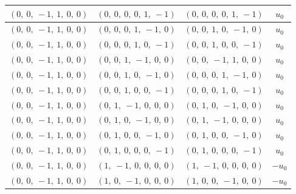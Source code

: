 \documentclass[11pt]{article}
\theoremstyle{definition}
\begin{document}
\begin{longtable}{|l|l|l|c|}
    \hline
    $\left( 0, \  0, \  -1, \  1, \  0, \  0\right)$ & $\left( 0, \  0, \  0, \  0, \  1, \  -1\right)$ & $\left( 0, \  0, \  0, \  0, \  1, \  -1\right)$ & $u_{0}$ \\
    \hline
    $\left( 0, \  0, \  -1, \  1, \  0, \  0\right)$ & $\left( 0, \  0, \  0, \  1, \  -1, \  0\right)$ & $\left( 0, \  0, \  1, \  0, \  -1, \  0\right)$ & $u_{0}$ \\
    \hline
    $\left( 0, \  0, \  -1, \  1, \  0, \  0\right)$ & $\left( 0, \  0, \  0, \  1, \  0, \  -1\right)$ & $\left( 0, \  0, \  1, \  0, \  0, \  -1\right)$ & $u_{0}$ \\
    \hline
    $\left( 0, \  0, \  -1, \  1, \  0, \  0\right)$ & $\left( 0, \  0, \  1, \  -1, \  0, \  0\right)$ & $\left( 0, \  0, \  -1, \  1, \  0, \  0\right)$ & $u_{0}$ \\
    \hline
    $\left( 0, \  0, \  -1, \  1, \  0, \  0\right)$ & $\left( 0, \  0, \  1, \  0, \  -1, \  0\right)$ & $\left( 0, \  0, \  0, \  1, \  -1, \  0\right)$ & $u_{0}$ \\
    \hline
    $\left( 0, \  0, \  -1, \  1, \  0, \  0\right)$ & $\left( 0, \  0, \  1, \  0, \  0, \  -1\right)$ & $\left( 0, \  0, \  0, \  1, \  0, \  -1\right)$ & $u_{0}$ \\
    \hline
    $\left( 0, \  0, \  -1, \  1, \  0, \  0\right)$ & $\left( 0, \  1, \  -1, \  0, \  0, \  0\right)$ & $\left( 0, \  1, \  0, \  -1, \  0, \  0\right)$ & $u_{0}$ \\
    \hline
    $\left( 0, \  0, \  -1, \  1, \  0, \  0\right)$ & $\left( 0, \  1, \  0, \  -1, \  0, \  0\right)$ & $\left( 0, \  1, \  -1, \  0, \  0, \  0\right)$ & $u_{0}$ \\
    \hline
    $\left( 0, \  0, \  -1, \  1, \  0, \  0\right)$ & $\left( 0, \  1, \  0, \  0, \  -1, \  0\right)$ & $\left( 0, \  1, \  0, \  0, \  -1, \  0\right)$ & $u_{0}$ \\
    \hline
    $\left( 0, \  0, \  -1, \  1, \  0, \  0\right)$ & $\left( 0, \  1, \  0, \  0, \  0, \  -1\right)$ & $\left( 0, \  1, \  0, \  0, \  0, \  -1\right)$ & $u_{0}$ \\
    \hline
    $\left( 0, \  0, \  -1, \  1, \  0, \  0\right)$ & $\left( 1, \  -1, \  0, \  0, \  0, \  0\right)$ & $\left( 1, \  -1, \  0, \  0, \  0, \  0\right)$ & $- u_{0}$ \\
    \hline
    $\left( 0, \  0, \  -1, \  1, \  0, \  0\right)$ & $\left( 1, \  0, \  -1, \  0, \  0, \  0\right)$ & $\left( 1, \  0, \  0, \  -1, \  0, \  0\right)$ & $- u_{0}$ \\

\end{longtable}
\end{document}
